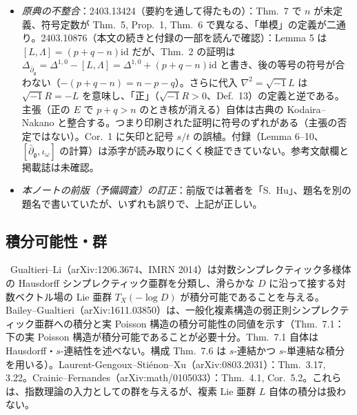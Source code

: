 \begin{itemize}
\item \emph{原典の不整合}：2403.13424（要約を通して得たもの）：Thm.\ 7 で $n$ が未定義、符号定数が Thm.\ 5, Prop.\ 1, Thm.\ 6 で異なる、「単模」の定義が二通り。2403.10876（本文の続きと付録の一部を読んで確認\tC）：Lemma 5 は $[L,\Lambda]=(p+q-n)\mathrm{id}$ だが、Thm.\ 2 の証明は $\Delta_{\bar\partial_{\mathfrak g}}=\Delta^{1,0}-[L,\Lambda]=\Delta^{1,0}+(p+q-n)\mathrm{id}$ と書き、後の等号の符号が合わない（$-(p+q-n)=n-p-q$）。さらに代入 $\nabla^2=\sqrt{-1}L$ は $\sqrt{-1}R=-L$ を意味し、「正」（$\sqrt{-1}R>0$、Def.\ 13）の定義と逆である。主張（正の $E$ で $p+q>n$ のとき核が消える）自体は古典の Kodaira--Nakano と整合する。つまり印刷された証明に符号のずれがある（主張の否定ではない）。Cor.\ 1 に矢印と記号 $s/t$ の誤植。付録（Lemma 6--10、$[\bar\partial_{\mathfrak g},\iota_\omega]$ の計算）は添字が読み取りにくく検証できていない。参考文献欄と掲載誌は未確認。\tQ
\item \emph{本ノートの前版（予備調査）の訂正}：前版では著者を「S.\ Hu」、題名を別の題名で書いていたが、いずれも誤りで、上記が正しい。
\end{itemize}

\subsection{積分可能性・群}
\tC\ Gualtieri--Li（arXiv:1206.3674、IMRN 2014）は対数シンプレクティック多様体の Hausdorff シンプレクティック亜群を分類し、滑らかな $D$ に沿って接する対数ベクトル場の Lie 亜群 $T_X(-\log D)$ が積分可能であることを与える。Bailey--Gualtieri（arXiv:1611.03850）は、一般化複素構造の弱正則シンプレクティック亜群への積分と実 Poisson 構造の積分可能性の同値を示す（Thm.\ 7.1：下の実 Poisson 構造が積分可能であることが必要十分。Thm.\ 7.1 自体は Hausdorff・$s$-連結性を述べない。構成 Thm.\ 7.6 は $s$-連結かつ $s$-単連結な積分を用いる）。Laurent-Gengoux--Stiénon--Xu（arXiv:0803.2031）：Thm.\ 3.17, 3.22。Crainic--Fernandes（arXiv:math/0105033）：Thm.\ 4.1, Cor.\ 5.2。これらは、指数理論の入力としての群を与えるが、複素 Lie 亜群 $L$ 自体の積分は扱わない。


